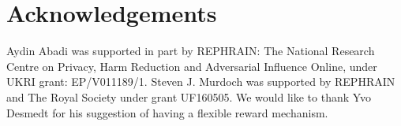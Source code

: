 

\section*{Acknowledgements}

Aydin Abadi was supported in part by REPHRAIN: The National Research Centre on Privacy, Harm Reduction and Adversarial Influence Online, under UKRI grant: EP/V011189/1. Steven J. Murdoch was supported by REPHRAIN and The Royal Society under grant UF160505. We would like to thank Yvo Desmedt for his suggestion of having a flexible reward mechanism. 
